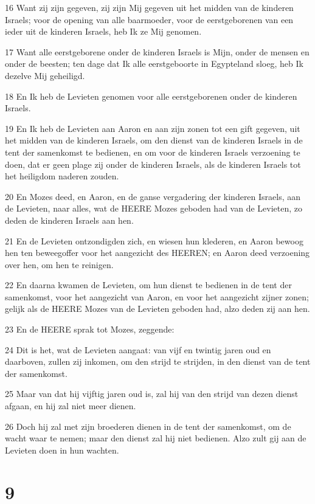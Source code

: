 \par 16 Want zij zijn gegeven, zij zijn Mij gegeven uit het midden van de kinderen Israels; voor de opening van alle baarmoeder, voor de eerstgeborenen van een ieder uit de kinderen Israels, heb Ik ze Mij genomen.
\par 17 Want alle eerstgeborene onder de kinderen Israels is Mijn, onder de mensen en onder de beesten; ten dage dat Ik alle eerstgeboorte in Egypteland sloeg, heb Ik dezelve Mij geheiligd.
\par 18 En Ik heb de Levieten genomen voor alle eerstgeborenen onder de kinderen Israels.
\par 19 En Ik heb de Levieten aan Aaron en aan zijn zonen tot een gift gegeven, uit het midden van de kinderen Israels, om den dienst van de kinderen Israels in de tent der samenkomst te bedienen, en om voor de kinderen Israels verzoening te doen, dat er geen plage zij onder de kinderen Israels, als de kinderen Israels tot het heiligdom naderen zouden.
\par 20 En Mozes deed, en Aaron, en de ganse vergadering der kinderen Israels, aan de Levieten, naar alles, wat de HEERE Mozes geboden had van de Levieten, zo deden de kinderen Israels aan hen.
\par 21 En de Levieten ontzondigden zich, en wiesen hun klederen, en Aaron bewoog hen ten beweegoffer voor het aangezicht des HEEREN; en Aaron deed verzoening over hen, om hen te reinigen.
\par 22 En daarna kwamen de Levieten, om hun dienst te bedienen in de tent der samenkomst, voor het aangezicht van Aaron, en voor het aangezicht zijner zonen; gelijk als de HEERE Mozes van de Levieten geboden had, alzo deden zij aan hen.
\par 23 En de HEERE sprak tot Mozes, zeggende:
\par 24 Dit is het, wat de Levieten aangaat: van vijf en twintig jaren oud en daarboven, zullen zij inkomen, om den strijd te strijden, in den dienst van de tent der samenkomst.
\par 25 Maar van dat hij vijftig jaren oud is, zal hij van den strijd van dezen dienst afgaan, en hij zal niet meer dienen.
\par 26 Doch hij zal met zijn broederen dienen in de tent der samenkomst, om de wacht waar te nemen; maar den dienst zal hij niet bedienen. Alzo zult gij aan de Levieten doen in hun wachten.

\chapter{9}

